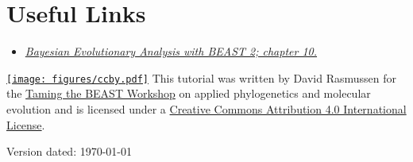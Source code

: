 \documentclass[11pt]{article}
\begin{document}
\bigskip
\section{Useful Links}

\begin{itemize}
\item \href{http://www.beast2.org/book.html}{\textit{Bayesian Evolutionary Analysis with BEAST 2; chapter 10.}}  \citep{BEAST2book2014}
\end{itemize}


\href{http://creativecommons.org/licenses/by/4.0/}{\texttt{[image: figures/ccby.pdf]}} This tutorial was written by David Rasmussen for the \href{https://www.bsse.ethz.ch/cevo/taming-the-beast.html}{Taming the BEAST Workshop} on applied phylogenetics and molecular evolution and is licensed under a \href{http://creativecommons.org/licenses/by/4.0/}{Creative Commons Attribution 4.0 International License}. 



Version dated: \today







\end{document}
